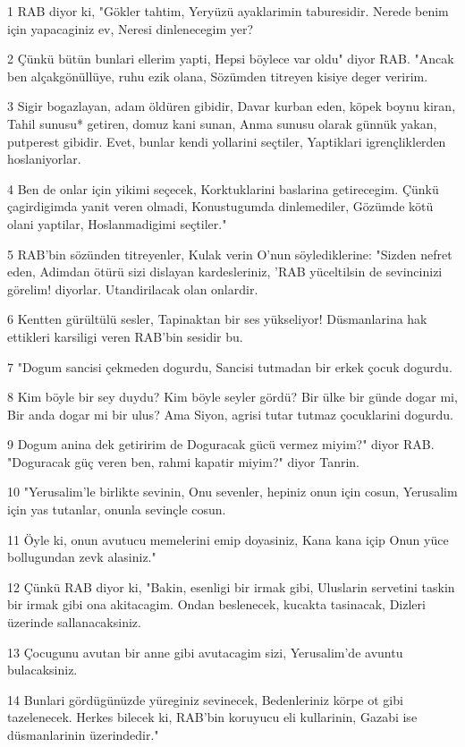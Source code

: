 \par 1 RAB diyor ki, "Gökler tahtim, Yeryüzü ayaklarimin taburesidir. Nerede benim için yapacaginiz ev, Neresi dinlenecegim yer?
\par 2 Çünkü bütün bunlari ellerim yapti, Hepsi böylece var oldu" diyor RAB. "Ancak ben alçakgönüllüye, ruhu ezik olana, Sözümden titreyen kisiye deger veririm.
\par 3 Sigir bogazlayan, adam öldüren gibidir, Davar kurban eden, köpek boynu kiran, Tahil sunusu* getiren, domuz kani sunan, Anma sunusu olarak günnük yakan, putperest gibidir. Evet, bunlar kendi yollarini seçtiler, Yaptiklari igrençliklerden hoslaniyorlar.
\par 4 Ben de onlar için yikimi seçecek, Korktuklarini baslarina getirecegim. Çünkü çagirdigimda yanit veren olmadi, Konustugumda dinlemediler, Gözümde kötü olani yaptilar, Hoslanmadigimi seçtiler."
\par 5 RAB'bin sözünden titreyenler, Kulak verin O'nun söylediklerine: "Sizden nefret eden, Adimdan ötürü sizi dislayan kardesleriniz, 'RAB yüceltilsin de sevincinizi görelim! diyorlar. Utandirilacak olan onlardir.
\par 6 Kentten gürültülü sesler, Tapinaktan bir ses yükseliyor! Düsmanlarina hak ettikleri karsiligi veren RAB'bin sesidir bu.
\par 7 "Dogum sancisi çekmeden dogurdu, Sancisi tutmadan bir erkek çocuk dogurdu.
\par 8 Kim böyle bir sey duydu? Kim böyle seyler gördü? Bir ülke bir günde dogar mi, Bir anda dogar mi bir ulus? Ama Siyon, agrisi tutar tutmaz çocuklarini dogurdu.
\par 9 Dogum anina dek getiririm de Doguracak gücü vermez miyim?" diyor RAB. "Doguracak güç veren ben, rahmi kapatir miyim?" diyor Tanrin.
\par 10 "Yerusalim'le birlikte sevinin, Onu sevenler, hepiniz onun için cosun, Yerusalim için yas tutanlar, onunla sevinçle cosun.
\par 11 Öyle ki, onun avutucu memelerini emip doyasiniz, Kana kana içip Onun yüce bollugundan zevk alasiniz."
\par 12 Çünkü RAB diyor ki, "Bakin, esenligi bir irmak gibi, Uluslarin servetini taskin bir irmak gibi ona akitacagim. Ondan beslenecek, kucakta tasinacak, Dizleri üzerinde sallanacaksiniz.
\par 13 Çocugunu avutan bir anne gibi avutacagim sizi, Yerusalim'de avuntu bulacaksiniz.
\par 14 Bunlari gördügünüzde yüreginiz sevinecek, Bedenleriniz körpe ot gibi tazelenecek. Herkes bilecek ki, RAB'bin koruyucu eli kullarinin, Gazabi ise düsmanlarinin üzerindedir."

